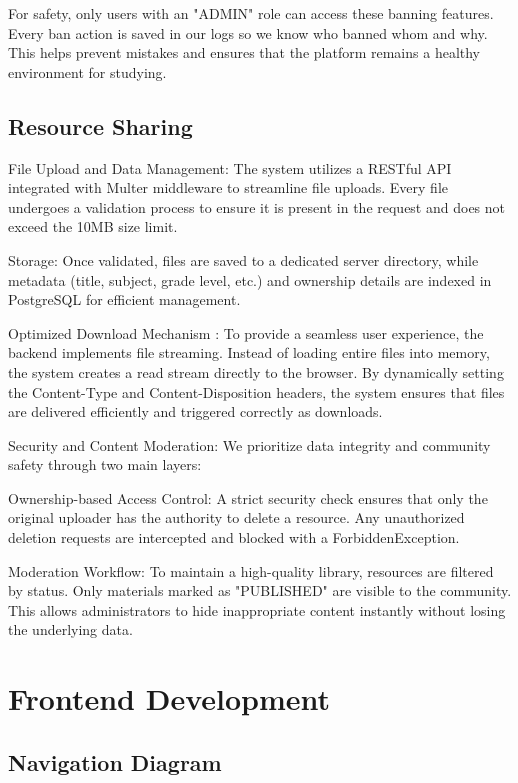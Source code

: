 \documentclass[a4paper,12pt]{report}
\begin{document}
For safety, only users with an "ADMIN" role can access these banning features. Every ban action is saved in our logs so we know who banned whom and why. This helps prevent mistakes and ensures that the platform remains a healthy environment for studying.

\subsection{Resource Sharing}

File Upload and Data Management: The system utilizes a RESTful API integrated with Multer middleware to streamline file uploads. Every file undergoes a validation process to ensure it is present in the request and does not exceed the 10MB size limit.

Storage: Once validated, files are saved to a dedicated server directory, while metadata (title, subject, grade level, etc.) and ownership details are indexed in PostgreSQL for efficient management.

Optimized Download Mechanism : To provide a seamless user experience, the backend implements file streaming. Instead of loading entire files into memory, the system creates a read stream directly to the browser. By dynamically setting the Content-Type and Content-Disposition headers, the system ensures that files are delivered efficiently and triggered correctly as downloads.

Security and Content Moderation: We prioritize data integrity and community safety through two main layers:

Ownership-based Access Control: A strict security check ensures that only the original uploader has the authority to delete a resource. Any unauthorized deletion requests are intercepted and blocked with a ForbiddenException.

Moderation Workflow: To maintain a high-quality library, resources are filtered by status. Only materials marked as "PUBLISHED" are visible to the community. This allows administrators to hide inappropriate content instantly without losing the underlying data.

\section{Frontend Development}

\subsection{Navigation Diagram}
\end{document}
